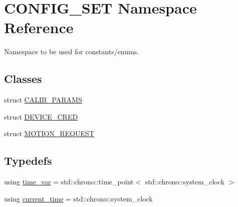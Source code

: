 \hypertarget{namespaceCONFIG__SET}{}\section{C\+O\+N\+F\+I\+G\+\_\+\+S\+ET Namespace Reference}
\label{namespaceCONFIG__SET}


Namespace to be used for constants/enums.  


\subsection*{Classes}
\begin{DoxyCompactItemize}
\item 
struct \hyperlink{structCONFIG__SET_1_1CALIB__PARAMS}{C\+A\+L\+I\+B\+\_\+\+P\+A\+R\+A\+MS}
\item 
struct \hyperlink{structCONFIG__SET_1_1DEVICE__CRED}{D\+E\+V\+I\+C\+E\+\_\+\+C\+R\+ED}
\item 
struct \hyperlink{structCONFIG__SET_1_1MOTION__REQUEST}{M\+O\+T\+I\+O\+N\+\_\+\+R\+E\+Q\+U\+E\+ST}
\end{DoxyCompactItemize}
\subsection*{Typedefs}
\begin{DoxyCompactItemize}
\item 
using \hyperlink{namespaceCONFIG__SET_a8816a22e7885d027a52bfa0d24fa9008}{time\+\_\+var} = std\+::chrono\+::time\+\_\+point$<$ std\+::chrono\+::system\+\_\+clock $>$
\item 
using \hyperlink{namespaceCONFIG__SET_a7a1c6f926aead4885c03f1fbeee693ce}{current\+\_\+time} = std\+::chrono\+::system\+\_\+clock
\end{DoxyCompactItemize}
